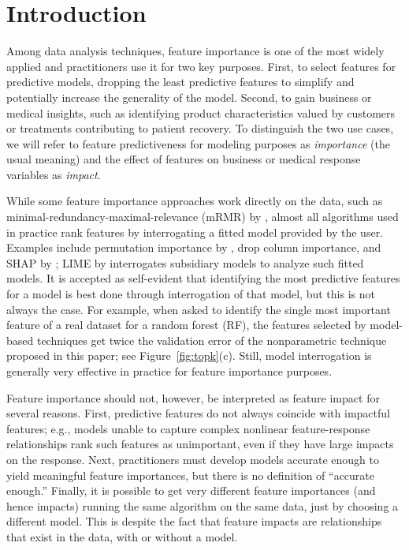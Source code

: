 \documentclass[11pt]{article}
\newcommand{\figref}[1]{Figure~\ref{#1}}
\newcommand{\todo}[1]{{{\small\color{red}{[#1]}}}}
\newcommand{\simp}{\fontfamily{cmr}\textsc{\small StratImpact}}
\newcommand{\simpo}{\fontfamily{cmr}\textsc{\small StratImport}}
\begin{document}
\section{Introduction}
\label{sec:intro}

\todo{
check \simp vs \simpo is confusing

Check, what is $R^2$?

threshold $2\sigma$ for \simp{} features

we use all X,y
boston: 1 trial. min samples per x = 1
rent: defaults, 5 trials
flight: cat min samples leaf=2
bulldozer: default

number of trials is a hyper parameter
}

Among data analysis techniques, feature importance is one of the most widely applied and practitioners use it for two key purposes. First, to select features for predictive models, dropping the least predictive features to simplify and potentially increase the generality of the model. Second, to gain business or medical insights, such as identifying product characteristics valued by customers or treatments contributing to patient recovery.  To distinguish the two use cases, we will refer to feature predictiveness for modeling purposes as {\em importance} (the usual meaning) and the effect of features on business or medical response variables as {\em impact}.

While some feature importance approaches work directly on the data, such as minimal-redundancy-maximal-relevance (mRMR) by \cite{mRMR}, almost all algorithms used in practice rank features by interrogating a fitted model provided by the user.  Examples include permutation importance by \cite{RF}, drop column importance, and SHAP by \cite{shap}; LIME by \cite{lime} interrogates subsidiary models to analyze such fitted models. It is accepted as self-evident that identifying the most predictive features for a model is best done through interrogation of that  model, but this is not always the case.  For example, when asked to identify the single most important feature of a real dataset \citep{bulldozer} for a random forest (RF), the features selected by model-based techniques get twice the validation error of the nonparametric technique proposed in this paper; see \figref{fig:topk}(c). Still, model interrogation is generally very effective in practice for feature importance purposes.

Feature importance should not, however, be interpreted as feature impact for several reasons. First, predictive features do not always coincide with impactful features; e.g., models unable to capture complex nonlinear feature-response relationships rank such features as unimportant, even if they have large impacts on the response. Next, practitioners must develop models accurate enough to yield meaningful feature importances, but there is no definition of ``accurate enough.'' Finally, it is possible to get very different feature importances (and hence impacts) running the same algorithm on the same data, just by choosing a different model. This is despite the fact that feature impacts are relationships that exist in the data, with or without a model.
\end{document}
